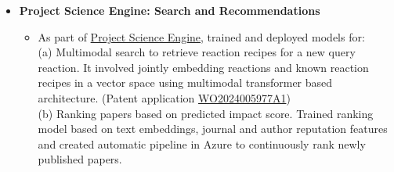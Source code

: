 \documentclass[margin,line]{resume}
\begin{document}
\begin{resume}
\begin{itemize}

\newpage

\item \textbf{Project Science Engine: Search and Recommendations}
\begin{itemize}
\item As part of \href{https://www.microsoft.com/en-us/research/project/project-s/overview/}{Project Science Engine}, trained and deployed models for:\\
(a) Multimodal search to retrieve reaction recipes for a new query reaction. It involved jointly embedding reactions and known reaction recipes in a vector space using multimodal transformer based architecture. (Patent application \href{https://patents.google.com/patent/WO2024005977A1/en?oq=WO2024005977A1}{WO2024005977A1}) \\
(b) Ranking papers based on predicted impact score. Trained ranking model based on text embeddings, journal and author reputation features and created automatic pipeline in Azure to continuously rank newly published papers.
\end{itemize}




\end{itemize}
\end{resume}
\end{document}
